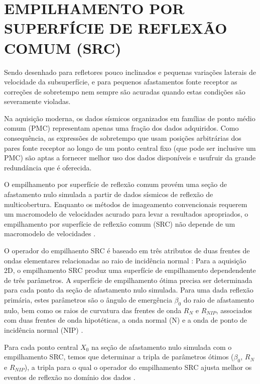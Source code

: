 \chapter{EMPILHAMENTO POR SUPERFÍCIE DE REFLEXÃO COMUM (SRC)}
\label{cap3}

Sendo desenhado para refletores pouco inclinados e pequenas variações laterais de velocidade da subsuperfície, e
para pequenos afastamentos fonte receptor as correções de sobretempo nem sempre são acuradas quando estas condições
são severamente violadas. \cite{tygel}

Na aquisição moderna, os dados sísmicos organizados em famílias de ponto médio comum (PMC) representam apenas uma fração
dos dados adquiridos. Como consequência, as expressões de sobretempo que usam posições arbitrárias dos pares fonte receptor
ao longo de um ponto central fixo (que pode ser inclusive um PMC) são aptas a fornecer melhor uso dos dados disponíveis
e usufruir da grande redundância que é oferecida. \cite{tygel}

O empilhamento por superfície de reflexão comum provém uma seção de afastamento nulo simulada a partir de dados sísmicos
de reflexão de multicobertura. Enquanto os métodos de imageamento convencionais requerem um macromodelo de velocidades
acurado para levar a resultados apropriados, o empilhamento por superfície de reflexão comum (SRC) não depende de um
macromodelo de velocidades \cite{jager}. 

O operador do empilhaento SRC é baseado em três atributos de duas frentes de ondas elementares
relacionadas ao raio de incidência normal \cite{hubral}:
Para a aquisição 2D, o empilhamento SRC produz uma superfície de empilhamento dependendente de três parâmetros.
A superfície de empilhamento ótima precisa ser determinada para cada ponto da seção de afastamento nulo simulada.
Para uma dada reflexão primária, estes parâmetros são o ângulo de emergência $\beta_0$ do raio de afastamento nulo, bem como
os raios de curvatura das frentes de onda $R_N$ e $R_{NIP}$, associados com duas frentes de onda hipotéticas,
a onda normal (N) e a onda de ponto de incidência normal (NIP) \cite{jager}.

Para cada ponto central $X_0$ na seção de afastamento nulo simulada com o empilhamento SRC, temos que determinar a tripla de
parâmetros ótimos ($\beta_0$, $R_N$ e $R_{NIP}$), a tripla para o qual o operador do empilhamento SRC ajusta melhor
os eventos de reflexão no domínio dos dados \cite{jager}.

